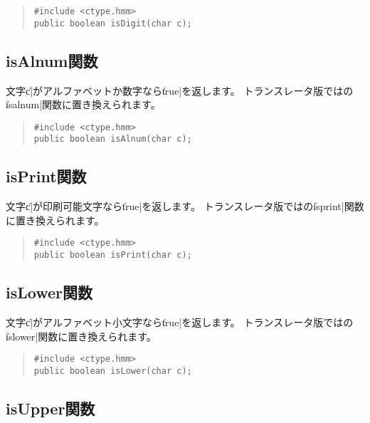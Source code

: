 \begin{quote}
\begin{verbatim}
#include <ctype.hmm>
public boolean isDigit(char c);
\end{verbatim}
\end{quote}

\subsection{isAlnum関数}

文字\|c|がアルファベットか数字なら\|true|を返します。
トランスレータ版では\cl の\|isalnum|関数に置き換えられます。

\begin{quote}
\begin{verbatim}
#include <ctype.hmm>
public boolean isAlnum(char c);
\end{verbatim}
\end{quote}

\subsection{isPrint関数}

文字\|c|が印刷可能文字なら\|true|を返します。
トランスレータ版では\cl の\|isprint|関数に置き換えられます。

\begin{quote}
\begin{verbatim}
#include <ctype.hmm>
public boolean isPrint(char c);
\end{verbatim}
\end{quote}

\subsection{isLower関数}

文字\|c|がアルファベット小文字なら\|true|を返します。
トランスレータ版では\cl の\|islower|関数に置き換えられます。

\begin{quote}
\begin{verbatim}
#include <ctype.hmm>
public boolean isLower(char c);
\end{verbatim}
\end{quote}

\subsection{isUpper関数}

